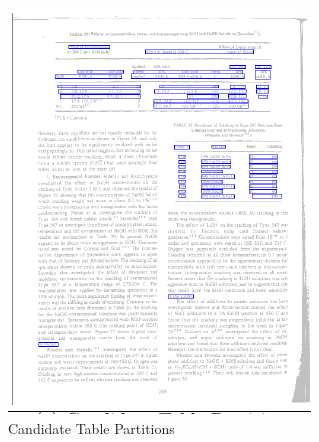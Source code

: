 \begin{figure}[H]
\begin{subfigure}{0.31\textwidth}
\includegraphics[width=\linewidth]{img/tableDetection/tableDetectionCandidate.pdf}
\caption{Candidate Table Partitions} \label{fig:1c}
\end{subfigure}
\begin{subfigure}{0.31\textwidth}

\end{subfigure}
\end{figure}
